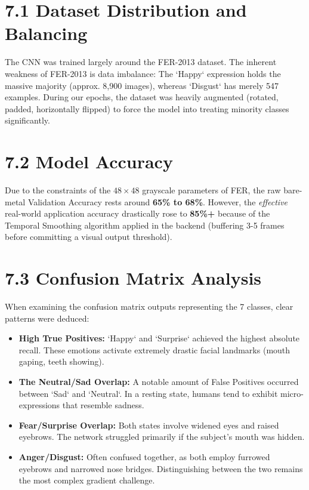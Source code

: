 \documentclass[12pt,a4paper]{report}
\begin{document}
\section*{7.1 Dataset Distribution and Balancing}
The CNN was trained largely around the FER-2013 dataset. The inherent weakness of FER-2013 is data imbalance: The `Happy` expression holds the massive majority (approx. 8,900 images), whereas `Disgust` has merely 547 examples. During our epochs, the dataset was heavily augmented (rotated, padded, horizontally flipped) to force the model into treating minority classes significantly.

\section*{7.2 Model Accuracy}
Due to the constraints of the $48 \times 48$ grayscale parameters of FER, the raw bare-metal Validation Accuracy rests around \textbf{65\% to 68\%}. However, the \textit{effective} real-world application accuracy drastically rose to \textbf{85\%+} because of the Temporal Smoothing algorithm applied in the backend (buffering 3-5 frames before committing a visual output threshold).

\section*{7.3 Confusion Matrix Analysis}
When examining the confusion matrix outputs representing the 7 classes, clear patterns were deduced:
\begin{itemize}
    \item \textbf{High True Positives:} `Happy` and `Surprise` achieved the highest absolute recall. These emotions activate extremely drastic facial landmarks (mouth gaping, teeth showing).
    \item \textbf{The Neutral/Sad Overlap:} A notable amount of False Positives occurred between `Sad` and `Neutral`. In a resting state, humans tend to exhibit micro-expressions that resemble sadness.
    \item \textbf{Fear/Surprise Overlap:} Both states involve widened eyes and raised eyebrows. The network struggled primarily if the subject's mouth was hidden.
    \item \textbf{Anger/Disgust:} Often confused together, as both employ furrowed eyebrows and narrowed nose bridges. Distinguishing between the two remains the most complex gradient challenge.
\end{itemize}
\end{document}
